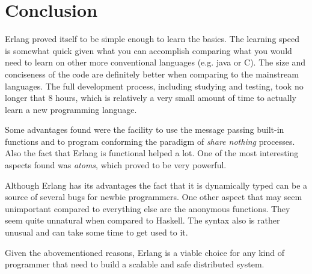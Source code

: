 \documentclass[twocolumn,10pt]{article}
\begin{document}
\section*{Conclusion}
Erlang proved itself to be simple enough to learn the basics. The learning speed is somewhat quick given what you can accomplish comparing what you would need to learn on other more conventional languages (e.g. java or C). The size and conciseness of the code are definitely better when comparing to the mainstream languages. The full development process, including studying and testing, took no longer that 8 hours, which is relatively a very small amount of time to actually learn a new programming language.

Some advantages found were the facility to use the message passing built-in functions and to program conforming the paradigm of \textit{share nothing} processes. Also the fact that Erlang is functional helped a lot. One of the most interesting aspects found was \textit{atoms}, which proved to be very powerful.

Although Erlang has its advantages the fact that it is dynamically typed can be a source of several bugs for newbie programmers. One other aspect that may seem unimportant compared to everything else are the anonymous functions. They seem quite unnatural when compared to Haskell. The syntax also is rather unusual and can take some time to get used to it.

Given the abovementioned reasons, Erlang is a viable choice for any kind of programmer that need to build a scalable and safe distributed system.
\end{document}
